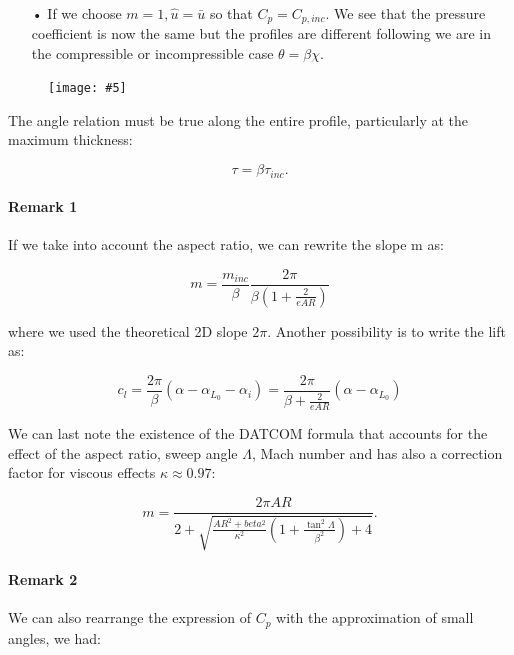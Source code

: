 \documentclass[british,french,11pt, a4paper, openany]{article}
\newcommand{\wrapfig}[6]{%
	\begin{figure}%
		\vspace{-5mm}%
		\texttt{[image: \#5]}%
		\captionof{figure}{}%
		\label{#6}%
	\end{figure}%
}
\begin{document}
\ \\
\begin{itemize}
	\item[•] If we choose $m=1, \hat{u} = \bar{u}$ so that $C_p = C_{p, inc}$. We see that the pressure coefficient is now the same but the profiles are different following we are in the compressible or incompressible case $\theta = \beta \chi$. 
\end{itemize}

\wrapfig{5}{l}{6.5}{0.1}{ch6/11}{fig:6.11}
The angle relation must be true along the entire profile, particularly at the maximum thickness: 

\begin{equation}
\tau = \beta \tau _{inc}. 
\end{equation}		

\paragraph{Remark 1}
If we take into account the aspect ratio, we can rewrite the slope m as: 

\begin{equation}
m = \frac{m_{inc}}{\beta} \frac{2\pi}{\beta \left(1+\frac{2}{eAR}\right)}
\end{equation}		

where we used the theoretical 2D slope $2\pi$. Another possibility is to write the lift as:

\begin{equation}
c_l = \frac{2\pi}{\beta} (\alpha - \alpha _{L_0} - \alpha _i) = \frac{2\pi}{\beta+\frac{2}{eAR}} (\alpha - \alpha _{L_0})
\end{equation}

We can	last note the existence of the DATCOM formula that accounts for the effect of the aspect ratio, sweep angle $\Lambda$, Mach number and has also a correction factor for viscous effects $\kappa \approx 0.97$: 

\begin{equation}
m = \frac{2\pi AR}{2+\sqrt{\frac{AR^2 + beta ^2}{\kappa ^2}\left( 1+\frac{\tan ^2\Lambda}{\beta ^2} \right)+4}}.
\end{equation}

\paragraph{Remark 2}
We can also rearrange the expression of $C_p$ with the approximation of small angles, we had: 
\end{document}
